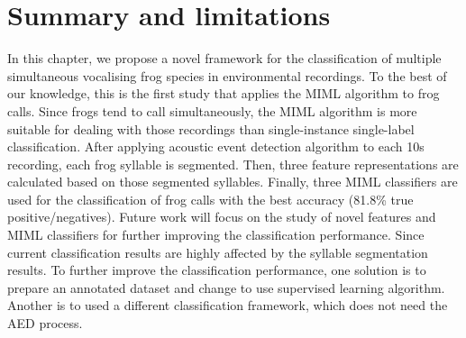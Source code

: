 \section{Summary and limitations}
In this chapter, we propose a novel framework for the classification of multiple simultaneous vocalising frog species in environmental recordings. To the best of our knowledge, this is the first study that applies the MIML algorithm to frog calls. Since frogs tend to call simultaneously, the MIML algorithm is more suitable for dealing with those recordings than single-instance single-label classification. After applying acoustic event detection algorithm to each 10s recording, each frog syllable is segmented. Then, three feature representations are calculated based on those segmented syllables. Finally, three MIML classifiers are used for the classification of frog calls with the best accuracy (81.8\% true positive/negatives). Future work will focus on the study of novel features and MIML classifiers for further improving the classification performance. Since current classification results are highly affected by the syllable segmentation results. To further improve the classification performance, one solution is to prepare an annotated dataset and change to use supervised learning algorithm. Another is to used a different classification framework, which does not need the AED process.  


